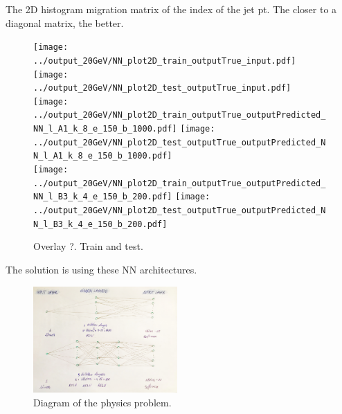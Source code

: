 The 2D histogram migration matrix of the index of the jet pt. The closer to a diagonal matrix, the better.

\begin{figure}[h]
  \centering
  \texttt{[image: ../output\_20GeV/NN\_plot2D\_train\_outputTrue\_input.pdf]}
  \texttt{[image: ../output\_20GeV/NN\_plot2D\_test\_outputTrue\_input.pdf]}\\
  \texttt{[image: ../output\_20GeV/NN\_plot2D\_train\_outputTrue\_outputPredicted\_NN\_l\_A1\_k\_8\_e\_150\_b\_1000.pdf]}
  \texttt{[image: ../output\_20GeV/NN\_plot2D\_test\_outputTrue\_outputPredicted\_NN\_l\_A1\_k\_8\_e\_150\_b\_1000.pdf]}\\
  \texttt{[image: ../output\_20GeV/NN\_plot2D\_train\_outputTrue\_outputPredicted\_NN\_l\_B3\_k\_4\_e\_150\_b\_200.pdf]}
  \texttt{[image: ../output\_20GeV/NN\_plot2D\_test\_outputTrue\_outputPredicted\_NN\_l\_B3\_k\_4\_e\_150\_b\_200.pdf]}\\
  \caption{Overlay ?. Train and test.}
  \label{fig:2DMigrationMatrix}
\end{figure}


The solution is using these NN architectures.

\begin{figure}[h]
  \centering
  \includegraphics[width=0.49\textwidth]{../presentation/plots/NNArchitecture.jpg}
  \caption{Diagram of the physics problem.}
  \label{fig:NNArchitecture}
\end{figure}

